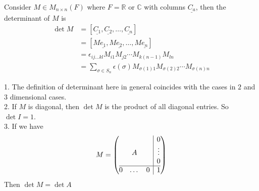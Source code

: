 \begin{definition}
    Consider $M\in M_{n\times n}(F)$ where $F=\mathbb R$ or $\mathbb C$ with columns $\underline{C_a}$, then the determinant of $M$ is
    \begin{align*}
        \det M&=[\underline{C_1},\underline{C_2},\ldots,\underline{C_n}]\\
        &=[M\underline{e_1},M\underline{e_2},\ldots,M\underline{e_n}]\\
        &=\epsilon_{ij\ldots kl}M_{i1}M_{j2}\cdots M_{k(n-1)}M_{ln}\\
        &=\sum_{\sigma\in S_n}\epsilon(\sigma)M_{\sigma(1)1}M_{\sigma(2)2}\cdots M_{\sigma(n)n}
    \end{align*}
\end{definition}
\begin{example}
    1. The definition of determinant here in general coincides with the cases in $2$ and $3$ dimensional cases.\\
    2. If $M$ is diagonal, then $\det M$ is the product of all diagonal entries.
    So $\det I=1$.\\
    3. If we have
    $$M=\left(\begin{array}{@{}ccc|c@{}}
        &&&0\\
        &A&&\vdots\\
        &&&0\\
        \hline
        0&\dots&0&1
    \end{array}\right)$$
    Then $\det M=\det A$
\end{example}
